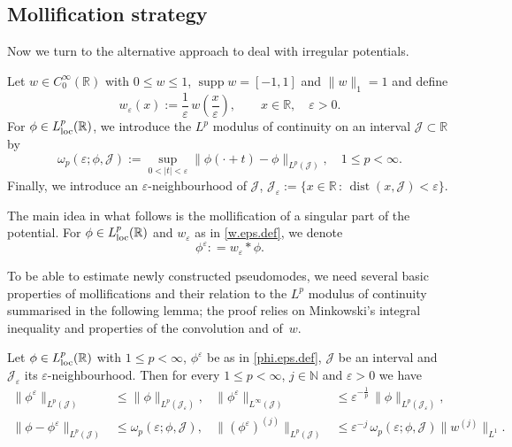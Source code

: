 \subsection{Mollification strategy}
Now we turn to the alternative approach to deal
with irregular potentials.

Let $ w \in C_0^\infty({\mathbb{R}})$ with $0 \leq w \leq 1$, 
${\mathop{\mathrm{supp}}\nolimits} w = [-1,1]$ and $\|w\|_1=1$ and define
\begin{equation}\label{w.eps.def}
w_{\varepsilon}(x):= \frac{1}{\varepsilon} \, w \left(\frac x {\varepsilon}\right), \qquad x \in {\mathbb{R}}, \quad {\varepsilon} >0.
\end{equation}
For $\phi \in L^p_{\rm loc}({\mathbb{R}})$, we introduce the $L^p$ modulus of continuity on an interval  ${\mathcal J} \subset{\mathbb{R}}$ by
\begin{equation}\label{omega.p.def}
\omega_p({\varepsilon};\phi,{\mathcal J}):= \sup_{0 < |t| < {\varepsilon}} 
\|\phi(\cdot + t) - \phi\|_{L^p({\mathcal J})}, \quad 1 \leq p < \infty.
\end{equation}
Finally, we introduce an ${\varepsilon}$-neighbourhood of ${\mathcal J}$,
${\mathcal J}_{\varepsilon} := \{x \in {\mathbb{R}} \, : \, {\mathop{\mathrm{dist}}\nolimits}(x,{\mathcal J}) < {\varepsilon} \}$.

The main idea in what follows is the mollification of a singular part of the potential. 
For $\phi \in L^p_{\rm loc}({\mathbb{R}})$ and $w_{\varepsilon}$ as in \eqref{w.eps.def}, we denote
\begin{equation}\label{phi.eps.def}
\phi^{\varepsilon} : = w_{\varepsilon} * \phi.
\end{equation}

To be able to estimate newly constructed pseudomodes, we need several basic properties of mollifications and their relation to the $L^p$ modulus of continuity summarised in the following lemma; the proof relies on Minkowski's integral inequality
and properties of the convolution and of~$w$. 
\begin{Lemma}\label{lem:mol}
Let $\phi \in L^p_{\rm loc}({\mathbb{R}})$ with $1 \leq p < \infty$, $\phi^{\varepsilon}$ be as in \eqref{phi.eps.def}, ${\mathcal J}$ be an interval and ${\mathcal J}_{\varepsilon}$ its ${\varepsilon}$-neighbourhood. 
Then for every $1 \leq p < \infty$, $j \in {\mathbb{N}}$ and ${\varepsilon}>0$ we have
\begin{align}
\|\phi^{\varepsilon} \|_{L^p({\mathcal J})} &\leq \|\phi \|_{L^p({\mathcal J}_{\varepsilon})},
&
\|\phi^{\varepsilon} \|_{L^\infty({\mathcal J})} &\leq {\varepsilon}^{-\frac1p} \, \|\phi \|_{L^p({\mathcal J}_{\varepsilon})}, \label{St.inf}
\\ 
\|\phi-\phi^{\varepsilon}\|_{L^p({\mathcal J})} &\leq \omega_p\left({\varepsilon}; \phi, {\mathcal J} \right),
&
\|(\phi^{\varepsilon})^{(j)}\|_{L^p({\mathcal J})} &\leq {\varepsilon}^{-j} \, 
\omega_p\left({\varepsilon}; \phi, {\mathcal J} \right)
\|w^{(j)}\|_{L^1}. 
\label{St.approx}
\end{align}
\end{Lemma}

